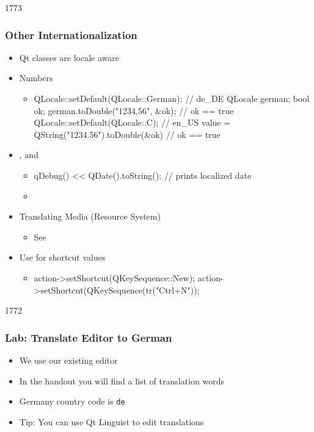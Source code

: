 \begin{slide}[fragile]{1773}\frametitle{Other Internationalization}
  \begin{itemize}
  \item Qt classes are locale aware
  \item Numbers
    \begin{itemize}
    \item[] \begin{cpp}
QLocale::setDefault(QLocale::German); // de_DE
QLocale german; bool ok;
german.toDouble("1234,56", &ok); // ok == true
QLocale::setDefault(QLocale::C); // en_US
value = QString("1234.56").toDouble(&ok) // ok == true
     \end{cpp}
   \end{itemize}
  \item {},  and 
    \begin{itemize}
    \item[] \begin{cpp}
qDebug() << QDate().toString();  // prints localized date
      \end{cpp}
   \item {}

    \end{itemize}
 \item Translating Media (Resource System)
   \begin{itemize}
   \item See 
   \end{itemize}
  \item Use  for shortcut values
    \begin{itemize}
    \item []\begin{cpp}
action->setShortcut(QKeySequence::New);
action->setShortcut(QKeySequence(tr("Ctrl+N"));
      \end{cpp}
    \end{itemize}
  \end{itemize}
\end{slide}


\begin{slide}{1772}
  \frametitle{Lab: Translate Editor to German}
  \begin{itemize}
  \item We use our existing editor
  \item In the handout you will find a list of translation words
  \item Germany country code is \texttt{de}
  \item Tip: You can use Qt Linguist to edit translations
  \end{itemize}
\end{slide}
